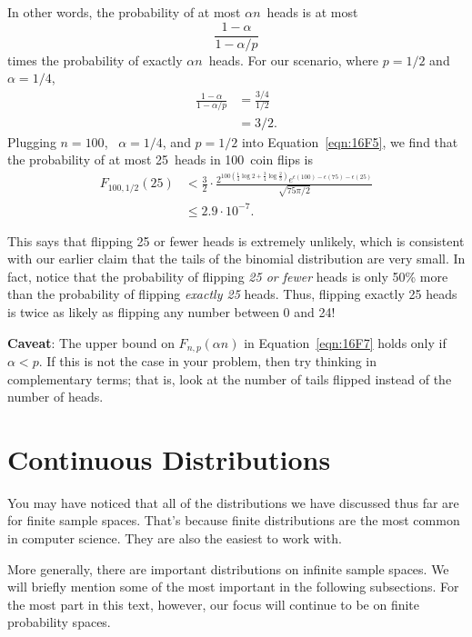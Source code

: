 In other words, the probability of at most $\alpha n$~heads is at most
\begin{equation*}
    \frac{1 - \alpha}{1 - \alpha/p}
\end{equation*}
times the probability of exactly $\alpha n$~heads. For our scenario,
where $p = 1/2$ and $\alpha = 1/4$,
\begin{align*}
\frac{1 - \alpha}{1 - \alpha/p}
    &= \frac{3/4}{1/2} \\
    &= 3/2.
\end{align*}
Plugging $n = 100$, \ $\alpha = 1/4$, and $p = 1/2$ into
Equation~\ref{eqn:16F5}, we find that the probability of at most
25~heads in 100~coin flips is
\begin{align*}
F_{100, 1/2}(25)
    &< \frac{3}{2} \cdot
        \frac{  \displaystyle
                2^{100 \left( \frac{1}{4} \log 2
                     + \frac{3}{4} \log \frac{2}{3} \right) }
                e^{ \epsilon(100) - \epsilon(75) - \epsilon(25) }
             }
             { \sqrt{75 \pi /2} } \\[3pt]
    &\le 2.9 \cdot 10^{-7}.
\end{align*}


This says that flipping 25 or fewer heads is extremely unlikely, which
is consistent with our earlier claim that the tails of the binomial
distribution are very small.  In fact, notice that the probability of
flipping \emph{25 or fewer} heads is only 50\% more than the
probability of flipping \emph{exactly 25} heads.  Thus, flipping
exactly 25 heads is twice as likely as flipping any number between 0
and 24!

\noindent \textbf{Caveat}: The upper bound on $F_{n, p}(\alpha n)$ in
Equation~\ref{eqn:16F7} holds only if $\alpha < p$.  If this is not
the case in your problem, then try thinking in complementary terms;
that is, look at the number of tails flipped instead of the number of
heads.

\section{Continuous Distributions}

You may have noticed that all of the distributions we have discussed
thus far are for finite sample spaces.  That's because finite
distributions are the most common in computer science.  They are also
the easiest to work with.

More generally, there are important distributions on infinite sample
spaces.  We will briefly mention some of the most important in the
following subsections.  For the most part in this text, however, our
focus will continue to be on finite probability spaces.

